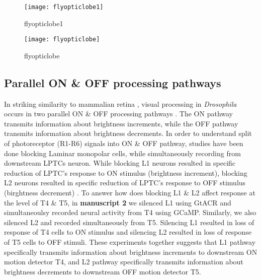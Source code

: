 \begin{figure}[h]
\centering
\texttt{[image: flyopticlobe1]}
\caption{flyopticlobe1}
\label{fig:flyopticlobe1}
\end{figure}

\begin{figure}[h]
\centering
\texttt{[image: flyopticlobe]}
\caption{flyopticlobe}
\label{fig:flyopticlobe}
\end{figure}

\subsection{Parallel ON \& OFF processing pathways}
In striking similarity to mammalian retina \parencite{Masland2012}, visual processing in \textit{Drosophila} occurs in two parallel ON \& OFF processing pathways \parencite{Borst2015}. The ON pathway transmits information about brightness increments, while the OFF pathway transmits information about brightness decrements. In order to understand split of photoreceptor (R1-R6) signals into ON \& OFF pathway, studies have been done blocking Laminar monopolar cells, while simultaneously recording from downstream LPTCs neuron. While blocking L1 neurons resulted in specific reduction of LPTC's response to ON stimulus (brightness increment), blocking L2 neurons resulted in specific reduction of LPTC's response to OFF stimulus (birghtness decrement) \parencite{Joesch2010}. To answer how does blocking L1 \& L2 affect response at the level of T4 \& T5, in \textbf{manuscript 2} we silenced L1 using GtACR and simultaneoulsy recorded neural activity from T4 using GCaMP. Similarly, we also silenced L2 and recorded simultaneously from T5. Silencing L1 resulted in loss of response of T4 cells to ON stimulus and silencing L2 resulted in loss of response of T5 cells to OFF stimuli. These experiments together suggests that L1 pathway specifically transmits information about brightness increments to downstream ON motion detector T4, and L2 pathway specifically transmits information about brightness decrements to downstream OFF motion detector T5. 

